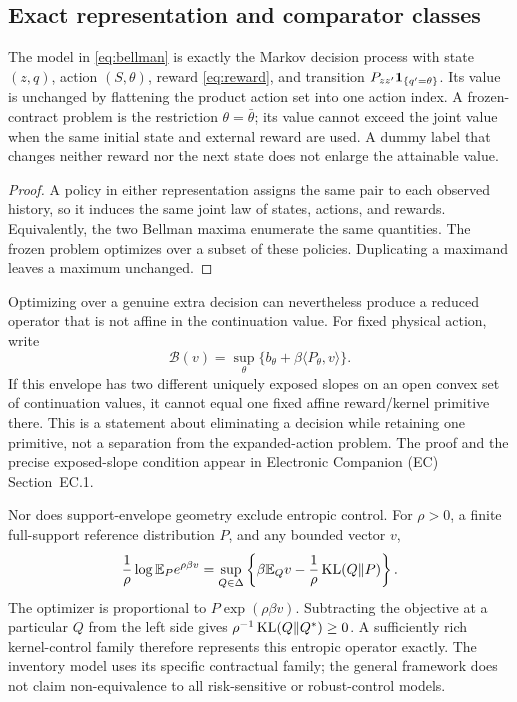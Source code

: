 \subsection{Exact representation and comparator classes}\label{sec:representation}
\begin{proposition}\label{prop:expanded}
The model in \eqref{eq:bellman} is exactly the Markov decision process with state $(z,q)$, action $(S,\theta)$, reward \eqref{eq:reward}, and transition $P_{zz'}\mathbf 1_{\{q'=\theta\}}$. Its value is unchanged by flattening the product action set into one action index. A frozen-contract problem is the restriction $\theta=\bar\theta$; its value cannot exceed the joint value when the same initial state and external reward are used. A dummy label that changes neither reward nor the next state does not enlarge the attainable value.
\end{proposition}
\begin{proof}
A policy in either representation assigns the same pair to each observed history, so it induces the same joint law of states, actions, and rewards. Equivalently, the two Bellman maxima enumerate the same quantities. The frozen problem optimizes over a subset of these policies. Duplicating a maximand leaves a maximum unchanged.\end{proof}

Optimizing over a genuine extra decision can nevertheless produce a reduced operator that is not affine in the continuation value. For fixed physical action, write
\begin{equation}\label{eq:support}
 \mathcal B(v)=\sup_{\theta}\{b_\theta+\beta\langle P_\theta,v\rangle\}.
\end{equation}
If this envelope has two different uniquely exposed slopes on an open convex set of continuation values, it cannot equal one fixed affine reward/kernel primitive there. This is a statement about eliminating a decision while retaining one primitive, not a separation from the expanded-action problem. The proof and the precise exposed-slope condition appear in Electronic Companion (EC) Section~EC.1.

Nor does support-envelope geometry exclude entropic control. For $\rho>0$, a finite full-support reference distribution $P$, and any bounded vector $v$,
\begin{equation}\label{eq:gibbs}
 \frac1\rho\log\mathbb E_P e^{\rho\beta v}
 =\sup_{Q\in\Delta}\left\{\beta\mathbb E_Qv-\frac1\rho\operatorname{KL}(Q\Vert P)\right\}.
\end{equation}
The optimizer is proportional to $P\exp(\rho\beta v)$. Subtracting the objective at a particular $Q$ from the left side gives $\rho^{-1}\operatorname{KL}(Q\Vert Q^*)\geq0$. A sufficiently rich kernel-control family therefore represents this entropic operator exactly. The inventory model uses its specific contractual family; the general framework does not claim non-equivalence to all risk-sensitive or robust-control models.



